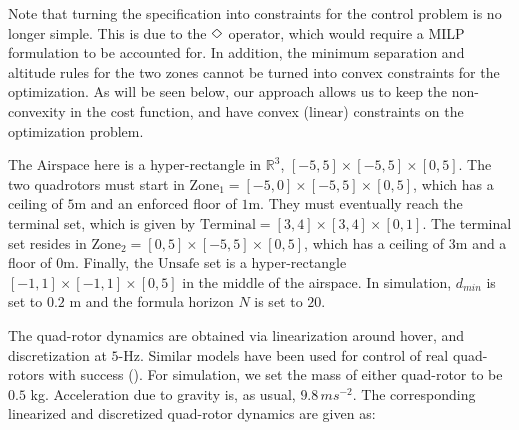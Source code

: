 Note that turning the specification into constraints for the control problem is no longer simple. 
This is due to the $\Diamond$ operator, which would require a MILP formulation to be accounted for. 
In addition, the minimum separation and altitude rules for the two zones cannot be turned into convex constraints for the optimization. As will be seen below, our approach allows us to keep the non-convexity in the cost function, and have convex (linear) constraints on the optimization problem.

The $\text{Airspace}$ here is a hyper-rectangle in $\mathbb{R}^3$, $[-5,5] \times [-5,5] \times [0,5]$.
The two quadrotors must start in $\text{Zone}_1 = [-5,0] \times [-5,5] \times [0,5]$, which has a ceiling of $5$m and an enforced floor of $1$m. 
They must eventually reach the terminal set, which is given by $\text{Terminal} = [3,4] \times [3,4] \times [0,1]$.
The terminal set resides in $\text{Zone}_2 = [0,5] \times [-5,5] \times [0,5]$, which has a ceiling of $3$m and a floor of $0$m.
Finally, the $\text{Unsafe}$ set is a hyper-rectangle $[-1,1] \times [-1,1] \times [0,5]$ in the middle of the airspace. In simulation, $d_{min}$ is set to $0.2$ m and the formula horizon $N$ is set to $20$.



The quad-rotor dynamics are obtained via linearization around hover, and discretization at $5$-Hz. Similar models have been used for control of real quad-rotors with success (\cite{PantAMNDM15_Anytime}). For simulation, we set the mass of either quad-rotor to be $0.5$ kg. Acceleration due to gravity is, as usual, $9.8\,ms^{-2}$.
The corresponding linearized and discretized quad-rotor dynamics are given as:

